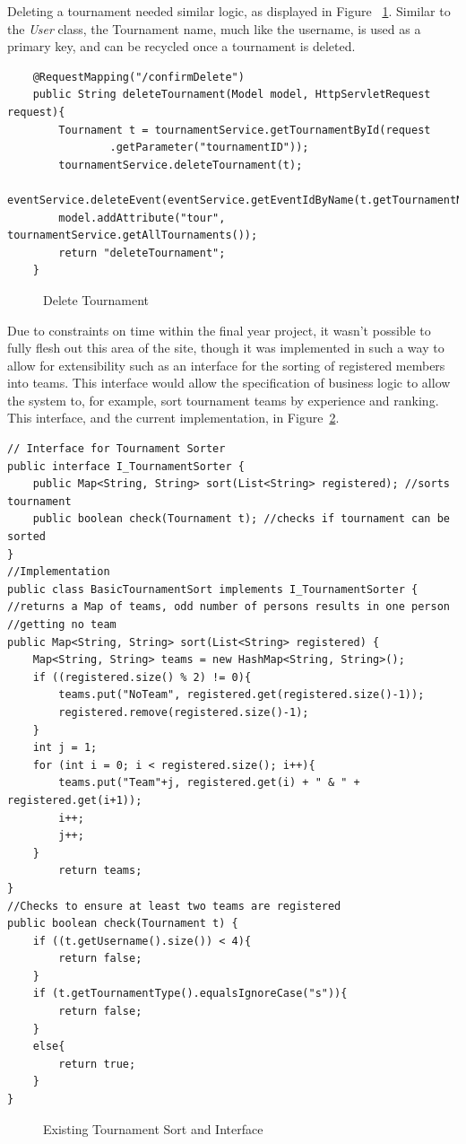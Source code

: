 Deleting a tournament needed similar logic, as displayed in Figure ~\ref{fig:deleteTour}. Similar to the \textit{User} class, the Tournament name, much like the username, is used as a primary key, and can be recycled once a tournament is deleted. 

\begin{lstlisting}
	@RequestMapping("/confirmDelete")
	public String deleteTournament(Model model, HttpServletRequest request){
		Tournament t = tournamentService.getTournamentById(request
				.getParameter("tournamentID"));
		tournamentService.deleteTournament(t);
		eventService.deleteEvent(eventService.getEventIdByName(t.getTournamentName()));
		model.addAttribute("tour", tournamentService.getAllTournaments());
		return "deleteTournament";
	}
\end{lstlisting}
\begin{figure}[H]
\caption{Delete Tournament}
\label{fig:deleteTour}
\end{figure}	

Due to constraints on time within the final year project, it wasn't possible to fully flesh out this area of the site, though it was implemented in such a way to allow for extensibility such as an interface for the sorting of registered members into teams. This interface would allow the specification of business logic to allow the system to, for example, sort tournament teams by experience and ranking. This interface, and the current implementation, in Figure~\ref{fig:tsort}.

\begin{lstlisting}
// Interface for Tournament Sorter
public interface I_TournamentSorter {
	public Map<String, String> sort(List<String> registered); //sorts tournament
	public boolean check(Tournament t); //checks if tournament can be sorted
}
//Implementation
public class BasicTournamentSort implements I_TournamentSorter {
//returns a Map of teams, odd number of persons results in one person
//getting no team
public Map<String, String> sort(List<String> registered) {
	Map<String, String> teams = new HashMap<String, String>();		
	if ((registered.size() % 2) != 0){
		teams.put("NoTeam", registered.get(registered.size()-1));
		registered.remove(registered.size()-1);
	}
	int j = 1;
	for (int i = 0; i < registered.size(); i++){
		teams.put("Team"+j, registered.get(i) + " & " + registered.get(i+1));
		i++;
		j++;
	}
		return teams;
}
//Checks to ensure at least two teams are registered
public boolean check(Tournament t) {
	if ((t.getUsername().size()) < 4){
		return false;
	}
	if (t.getTournamentType().equalsIgnoreCase("s")){
		return false;
	}
	else{
		return true;
	}
}
\end{lstlisting}
\begin{figure}
\caption{Existing Tournament Sort and Interface}
\label{fig:tsort}
\end{figure}

